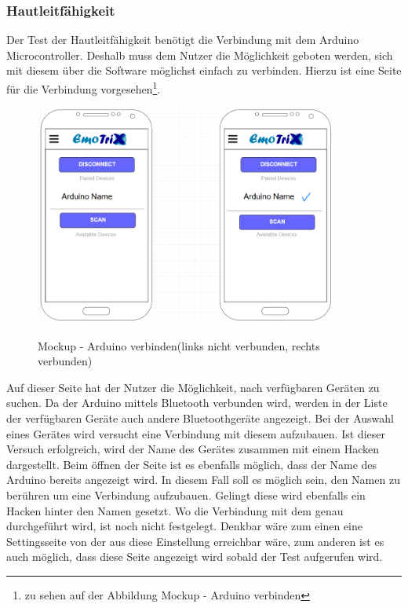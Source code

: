 \subsubsection{Hautleitfähigkeit}
Der Test der Hautleitfähigkeit benötigt die Verbindung mit dem Arduino Microcontroller. Deshalb muss dem Nutzer die Möglichkeit geboten werden, sich mit diesem über die Software möglichst einfach zu verbinden. Hierzu ist eine Seite für die Verbindung vorgesehen\footnote{zu sehen auf der Abbildung Mockup - Arduino verbinden}. 
\begin{figure}[h]
	\centering
	\includegraphics[width=10cm]{Bilder/Mockup-Arduino-Connection.png}
	\label{img:Mockup-Arduino-Connection}
	\caption[Mockup - Arduino verbinden(links nicht verbunden, rechts verbunden)]{Mockup - Arduino verbinden(links nicht verbunden, rechts verbunden)}
\end{figure}%
Auf dieser Seite hat der Nutzer die Möglichkeit, nach verfügbaren Geräten zu suchen. Da der Arduino mittels Bluetooth verbunden wird, werden in der Liste der verfügbaren Geräte auch andere Bluetoothgeräte angezeigt. Bei der Auswahl eines Gerätes wird versucht eine Verbindung mit diesem aufzubauen. Ist dieser Versuch erfolgreich, wird der Name des Gerätes zusammen mit einem Hacken dargestellt. Beim öffnen der Seite ist es ebenfalls möglich, dass der Name des Arduino bereits angezeigt wird. In diesem Fall soll es möglich sein, den Namen zu berühren um eine Verbindung aufzubauen. Gelingt diese wird ebenfalls ein Hacken hinter den Namen gesetzt.\newline
Wo die Verbindung mit dem genau durchgeführt wird, ist noch nicht festgelegt. Denkbar wäre zum einen eine Settingsseite von der aus diese Einstellung erreichbar wäre, zum anderen ist es auch möglich, dass diese Seite angezeigt wird sobald der Test aufgerufen wird.\newline
